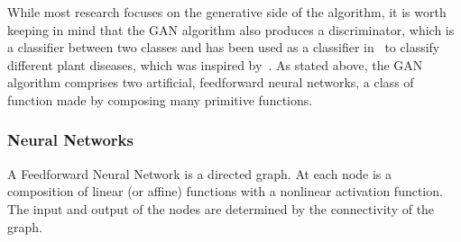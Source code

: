 While most research focuses on the generative side of the algorithm,
it is worth keeping in mind that the GAN algorithm also produces a
discriminator, which is a classifier between two classes and has been
used as a classifier in~\cite{ref:cortes-2017} to classify different
plant diseases, which was inspired by~\cite{ref:odena-2016}.  As
stated above, the GAN algorithm comprises two artificial, feedforward
neural networks, a class of function made by composing many primitive
functions.

\subsubsection*{Neural Networks}

\begin{definition}
  A \textnormal{\sffamily Feedforward Neural Network} is a directed
  graph. At each node is a composition of linear (or affine) functions
  with a nonlinear activation function. The input and output of the
  nodes are determined by the connectivity of the graph.
\end{definition}

